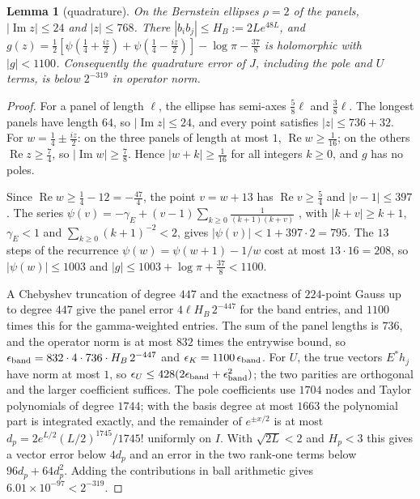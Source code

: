 \documentclass[11pt]{amsart}
\newtheorem{lemma}[proposition]{Lemma}
\theoremstyle{remark}
\numberwithin{equation}{section}
\begin{document}
\begin{lemma}[quadrature]\label{lem:quad}
On the Bernstein ellipses $\rho=2$ of the panels, $|\operatorname{Im}z|\le24$ and $|z|\le768$. There $|b_ib_j|\le H_B:=2Le^{48L}$, and $g(z)=\frac12[\psi(\frac14+\frac{iz}2)+\psi(\frac14-\frac{iz}2)]-\log\pi-\frac{37}8$ is holomorphic with $|g|<1100$. Consequently the quadrature error of $J$, including the pole and $U$ terms, is below $2^{-319}$ in operator norm.
\end{lemma}
\begin{proof}
For a panel of length $\ell$, the ellipse has semi-axes $\frac58\ell$ and $\frac38\ell$. The longest panels have length $64$, so $|\operatorname{Im}z|\le24$, and every point satisfies $|z|\le736+32$. For $w=\frac14\pm\frac{iz}2$: on the three panels of length at most $1$, $\operatorname{Re}w\ge\frac1{16}$; on the others $\operatorname{Re}z\ge\frac74$, so $|\operatorname{Im}w|\ge\frac78$. Hence $|w+k|\ge\frac1{16}$ for all integers $k\ge0$, and $g$ has no poles.

Since $\operatorname{Re}w\ge\frac14-12=-\frac{47}4$, the point $v=w+13$ has $\operatorname{Re}v\ge\frac54$ and $|v-1|\le397$. The series $\psi(v)=-\gamma_E+(v-1)\sum_{k\ge0}\frac1{(k+1)(k+v)}$ \cite[5.7.6]{DLMF}, with $|k+v|\ge k+1$, $\gamma_E<1$ and $\sum_{k\ge0}(k+1)^{-2}<2$, gives $|\psi(v)|<1+397\cdot2=795$. The $13$ steps of the recurrence $\psi(w)=\psi(w+1)-1/w$ cost at most $13\cdot16=208$, so $|\psi(w)|\le1003$ and $|g|\le1003+\log\pi+\frac{37}8<1100$.

A Chebyshev truncation of degree $447$ and the exactness of $224$-point Gauss up to degree $447$ give the panel error $4\ell H_B\,2^{-447}$ for the band entries, and $1100$ times this for the gamma-weighted entries. The sum of the panel lengths is $736$, and the operator norm is at most $832$ times the entrywise bound, so $\epsilon_{\rm band}=832\cdot4\cdot736\cdot H_B\,2^{-447}$ and $\epsilon_K=1100\,\epsilon_{\rm band}$. For $U$, the true vectors $E^*h_j$ have norm at most $1$, so $\epsilon_U\le428(2\epsilon_{\rm band}+\epsilon_{\rm band}^2)$; the two parities are orthogonal and the larger coefficient suffices. The pole coefficients use $1704$ nodes and Taylor polynomials of degree $1744$; with the basis degree at most $1663$ the polynomial part is integrated exactly, and the remainder of $e^{\pm x/2}$ is at most $d_p=2e^{L/2}(L/2)^{1745}/1745!$ uniformly on $I$. With $\sqrt{2L}<2$ and $H_p<3$ this gives a vector error below $4d_p$ and an error in the two rank-one terms below $96d_p+64d_p^2$. Adding the contributions in ball arithmetic gives $6.01\times10^{-97}<2^{-319}$.
\end{proof}
\end{document}
